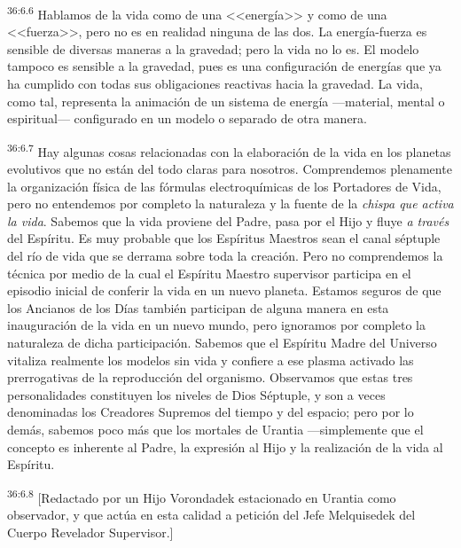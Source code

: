 \par
\textsuperscript{36:6.6} Hablamos de la vida como de una <<energía>> y como de una <<fuerza>>, pero no es en realidad ninguna de las dos. La energía-fuerza es sensible de diversas maneras a la gravedad; pero la vida no lo es. El modelo tampoco es sensible a la gravedad, pues es una configuración de energías que ya ha cumplido con todas sus obligaciones reactivas hacia la gravedad. La vida, como tal, representa la animación de un sistema de energía ---material, mental o espiritual--- configurado en un modelo o separado de otra manera.

\par
\textsuperscript{36:6.7} Hay algunas cosas relacionadas con la elaboración de la vida en los planetas evolutivos que no están del todo claras para nosotros. Comprendemos plenamente la organización física de las fórmulas electroquímicas de los Portadores de Vida, pero no entendemos por completo la naturaleza y la fuente de la \textit{chispa que activa la vida}. Sabemos que la vida proviene del Padre, pasa por el Hijo y fluye \textit{a través} del Espíritu. Es muy probable que los Espíritus Maestros sean el canal séptuple del río de vida que se derrama sobre toda la creación. Pero no comprendemos la técnica por medio de la cual el Espíritu Maestro supervisor participa en el episodio inicial de conferir la vida en un nuevo planeta. Estamos seguros de que los Ancianos de los Días también participan de alguna manera en esta inauguración de la vida en un nuevo mundo, pero ignoramos por completo la naturaleza de dicha participación. Sabemos que el Espíritu Madre del Universo vitaliza realmente los modelos sin vida y confiere a ese plasma activado las prerrogativas de la reproducción del organismo. Observamos que estas tres personalidades constituyen los niveles de Dios Séptuple, y son a veces denominadas los Creadores Supremos del tiempo y del espacio; pero por lo demás, sabemos poco más que los mortales de Urantia ---simplemente que el concepto es inherente al Padre, la expresión al Hijo y la realización de la vida al Espíritu.

\par
\textsuperscript{36:6.8} [Redactado por un Hijo Vorondadek estacionado en Urantia como observador, y que actúa en esta calidad a petición del Jefe Melquisedek del Cuerpo Revelador Supervisor.]